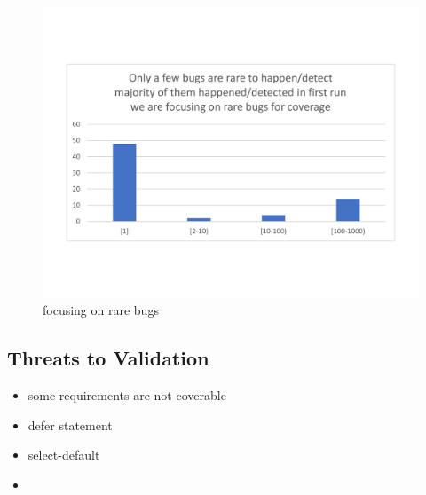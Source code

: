 \begin{figure}
\centering
  \includegraphics[width=.95\linewidth]{figs/coverage_motivation_tentative.pdf}
  \caption{focusing on rare bugs}
  \label{fig:rare_bugs}
\end{figure}



\subsection{Threats to Validation}
\begin{itemize}
  \item some requirements are not coverable
  \item defer statement
  \item select-default
  \item
\end{itemize}

